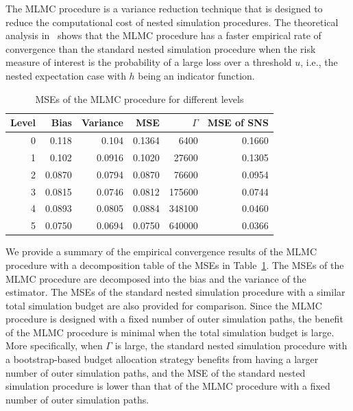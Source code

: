 The MLMC procedure is a variance reduction technique that is designed to reduce the computational cost of nested simulation procedures.
The theoretical analysis in~\cite{giles2019multilevel} shows that the MLMC procedure has a faster empirical rate of convergence than the standard nested simulation procedure when the risk measure of interest is the probability of a large loss over a threshold $u$, i.e., the nested expectation case with $h$ being an indicator function.

\begin{table}[ht]
    \centering
    \begin{tabular}{rrrrrr}
    \toprule
    \textbf{Level} & \textbf{Bias} & \textbf{Variance} & \textbf{MSE} & $\Gamma$ & \textbf{MSE of SNS} \\ 
    \hline\hline
    0 & 0.118  & 0.104  & 0.1364 & 6400     & 0.1660    \\
    1 & 0.102  & 0.0916 & 0.1020 & 27600    & 0.1305    \\
    2 & 0.0870 & 0.0794 & 0.0870 & 76600    & 0.0954    \\
    3 & 0.0815 & 0.0746 & 0.0812 & 175600   & 0.0744    \\
    4 & 0.0893 & 0.0805 & 0.0884 & 348100   & 0.0460    \\
    5 & 0.0750 & 0.0694 & 0.0750 & 640000   & 0.0366    \\
    \bottomrule
    \end{tabular}
    \caption{MSEs of the MLMC procedure for different levels}
    \label{tab1:mlmc-mse}
\end{table}

We provide a summary of the empirical convergence results of the MLMC procedure with a decomposition table of the MSEs in Table~\ref{tab1:mlmc-mse}.
The MSEs of the MLMC procedure are decomposed into the bias and the variance of the estimator.
The MSEs of the standard nested simulation procedure with a similar total simulation budget are also provided for comparison.
Since the MLMC procedure is designed with a fixed number of outer simulation paths, the benefit of the MLMC procedure is minimal when the total simulation budget is large.
More specifically, when $\Gamma$ is large, the standard nested simulation procedure with a bootstrap-based budget allocation strategy benefits from having a larger number of outer simulation paths, and the MSE of the standard nested simulation procedure is lower than that of the MLMC procedure with a fixed number of outer simulation paths.

